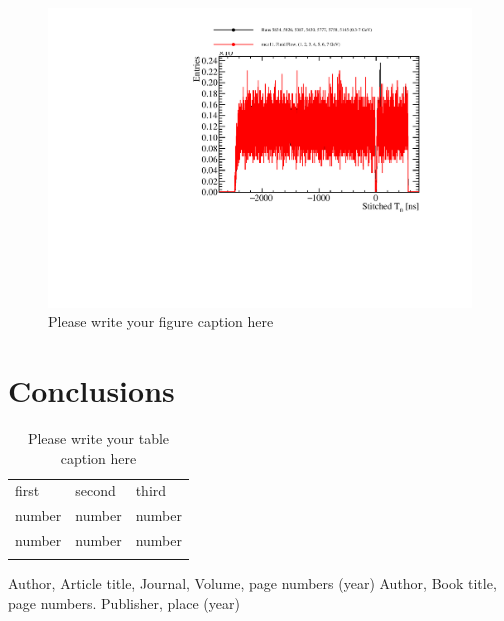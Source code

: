 \begin{figure}
\includegraphics[width=1.0\textwidth]{Figures/Metrics/Data/Cosmics/StitchedT0.pdf}
\caption{Please write your figure caption here}
\label{fig:8}
\end{figure}

\section{Conclusions}

\begin{table}
\caption{Please write your table caption here}
\label{tab:1}       %
\begin{tabular}{lll}
\hline\noalign{\smallskip}
first & second & third  \\
\noalign{\smallskip}\hline\noalign{\smallskip}
number & number & number \\
number & number & number \\
\noalign{\smallskip}\hline
\end{tabular}
\end{table}




\begin{thebibliography}{}
%
%
Author, Article title, Journal, Volume, page numbers (year)
Author, Book title, page numbers. Publisher, place (year)
\end{thebibliography}



